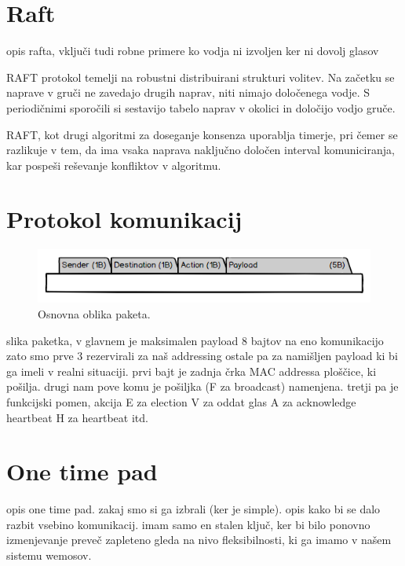 \documentclass[runningheads]{llncs}
\begin{document}
\section{Raft}
opis rafta, vključi tudi robne primere ko vodja ni izvoljen ker ni dovolj glasov

RAFT protokol temelji na robustni distribuirani strukturi volitev. Na začetku se naprave v gruči ne zavedajo drugih naprav, niti nimajo določenega vodje. S periodičnimi sporočili si sestavijo tabelo naprav v okolici in določijo vodjo gruče.

RAFT, kot drugi algoritmi za doseganje konsenza uporablja timerje, pri čemer se razlikuje v tem, da ima vsaka naprava naključno določen interval komuniciranja, kar pospeši reševanje konfliktov v algoritmu.

\section{Protokol komunikacij}
\begin{figure}
  \includegraphics[width=\linewidth]{packet.png}
  \caption{Osnovna oblika paketa.}
  \label{fig:paket}
\end{figure}
slika paketka, v glavnem je maksimalen payload 8 bajtov na eno komunikacijo zato smo prve 3 rezervirali za naš addressing ostale pa za namišljen payload ki bi ga imeli v realni situaciji.
prvi bajt je zadnja črka MAC addressa ploščice, ki pošilja. drugi nam pove komu je pošiljka (F za broadcast) namenjena. tretji pa je funkcijski pomen, akcija E za election V za oddat glas A za acknowledge heartbeat H za heartbeat itd.
\section{One time pad}
opis one time pad. zakaj smo si ga izbrali (ker je simple). opis kako bi se dalo razbit vsebino komunikacij. imam samo en stalen ključ, ker bi bilo ponovno izmenjevanje preveč zapleteno gleda na nivo fleksibilnosti, ki ga imamo v našem sistemu wemosov.
\end{document}
